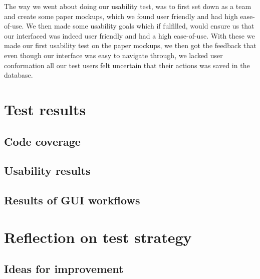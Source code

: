 The way we went about doing our usability test, was to first set down as a team and create some paper mockups, which we found user friendly and had high ease-of-use. We then made some usability goals which if fulfilled, would ensure us that our interfaced was indeed user friendly and had a high ease-of-use. With these we made our first usability test on the paper mockups, we then got the feedback that even though our interface was easy to navigate through, we lacked user conformation all our test users felt uncertain that their actions was saved in the database.


\section{Test results}
\label{Testing_Results}

\subsection{Code coverage}
\label{Testing_Results_Coverage}

\subsection{Usability results}
\label{Testing_Results_Usability}

\subsection{Results of GUI workflows}
\label{Testing_Results_Workflows}

\section{Reflection on test strategy}
\label{Testing_Reflection}

\subsection{Ideas for improvement}
\label{Testing_Reflection_improvements}
